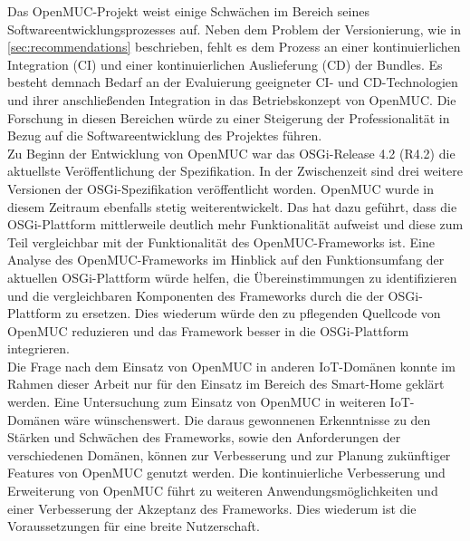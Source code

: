 Das OpenMUC-Projekt weist einige Schwächen im Bereich seines Softwareentwicklungsprozesses auf.
Neben dem Problem der Versionierung, wie in \autoref{sec:recommendations} beschrieben, fehlt es dem Prozess 
an einer kontinuierlichen Integration (\ac{CI}) und einer kontinuierlichen Auslieferung (\ac{CD}) der Bundles.
Es besteht demnach Bedarf an der Evaluierung geeigneter \ac{CI}- und \ac{CD}-Technologien und
ihrer anschließenden Integration in das Betriebskonzept von OpenMUC.
Die Forschung in diesen Bereichen würde zu einer Steigerung der Professionalität in Bezug auf die Softwareentwicklung des Projektes führen.\\

Zu Beginn der Entwicklung von OpenMUC war das \ac{OSGi}-Release 4.2 (R4.2) die aktuellste Veröffentlichung der Spezifikation. 
In der Zwischenzeit sind drei weitere Versionen der \ac{OSGi}-Spezifikation veröffentlicht worden.
OpenMUC wurde in diesem Zeitraum ebenfalls stetig weiterentwickelt.
Das hat dazu geführt, dass die \ac{OSGi}-Plattform mittlerweile deutlich mehr Funktionalität aufweist und diese zum Teil vergleichbar mit der Funktionalität des OpenMUC-Frameworks ist.
Eine Analyse des OpenMUC-Frameworks im Hinblick auf den Funktionsumfang der aktuellen \ac{OSGi}-Plattform würde helfen, die Übereinstimmungen zu identifizieren
und die vergleichbaren Komponenten des Frameworks durch die der \ac{OSGi}-Plattform zu ersetzen.
Dies wiederum würde den zu pflegenden Quellcode von OpenMUC reduzieren und das Framework besser in die \ac{OSGi}-Plattform integrieren.\\

Die Frage nach dem Einsatz von OpenMUC in anderen \ac{IoT}-Domänen konnte im Rahmen dieser Arbeit nur für den Einsatz im 
Bereich des Smart-Home geklärt werden.
Eine Untersuchung zum Einsatz von OpenMUC in weiteren \ac{IoT}-Domänen wäre wünschenswert. 
Die daraus gewonnenen Erkenntnisse zu den Stärken und Schwächen des Frameworks, sowie den Anforderungen der verschiedenen Domänen,
können zur Verbesserung und zur Planung zukünftiger Features von OpenMUC genutzt werden.
Die kontinuierliche Verbesserung und Erweiterung von OpenMUC führt zu weiteren Anwendungsmöglichkeiten und einer Verbesserung der Akzeptanz des Frameworks.
Dies wiederum ist die Voraussetzungen für eine breite Nutzerschaft.
